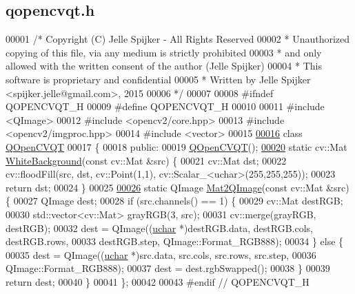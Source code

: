 \hypertarget{qopencvqt_8h_source}{}\subsection{qopencvqt.\+h}
\label{qopencvqt_8h_source}

\begin{DoxyCode}
00001 \textcolor{comment}{/* Copyright (C) Jelle Spijker - All Rights Reserved}
00002 \textcolor{comment}{ * Unauthorized copying of this file, via any medium is strictly prohibited}
00003 \textcolor{comment}{ * and only allowed with the written consent of the author (Jelle Spijker)}
00004 \textcolor{comment}{ * This software is proprietary and confidential}
00005 \textcolor{comment}{ * Written by Jelle Spijker <spijker.jelle@gmail.com>, 2015}
00006 \textcolor{comment}{ */}
00007 
00008 \textcolor{preprocessor}{#ifndef QOPENCVQT\_H}
00009 \textcolor{preprocessor}{#define QOPENCVQT\_H}
00010 
00011 \textcolor{preprocessor}{#include <QImage>}
00012 \textcolor{preprocessor}{#include <opencv2/core.hpp>}
00013 \textcolor{preprocessor}{#include <opencv2/imgproc.hpp>}
00014 \textcolor{preprocessor}{#include <vector>}
00015 
\hypertarget{qopencvqt_8h_source_l00016}{}\hyperlink{class_q_open_c_v_q_t}{00016} \textcolor{keyword}{class }\hyperlink{class_q_open_c_v_q_t}{QOpenCVQT}
00017 \{
00018 \textcolor{keyword}{public}:
00019   \hyperlink{class_q_open_c_v_q_t_a6c108b923cac9d18ae3fd75215aca6a5}{QOpenCVQT}();
\hypertarget{qopencvqt_8h_source_l00020}{}\hyperlink{class_q_open_c_v_q_t_a3aa480e80e8d70328811d0ac75b2df52}{00020}   \textcolor{keyword}{static} cv::Mat \hyperlink{class_q_open_c_v_q_t_a3aa480e80e8d70328811d0ac75b2df52}{WhiteBackground}(\textcolor{keyword}{const} cv::Mat &src) \{
00021     cv::Mat dst;
00022     cv::floodFill(src, dst, cv::Point(1,1), cv::Scalar\_<uchar>(255,255,255));
00023     \textcolor{keywordflow}{return} dst;
00024   \}
00025 
\hypertarget{qopencvqt_8h_source_l00026}{}\hyperlink{class_q_open_c_v_q_t_ab1d34f10d11fbf4ddc00ce55c0255023}{00026}   \textcolor{keyword}{static} QImage \hyperlink{class_q_open_c_v_q_t_ab1d34f10d11fbf4ddc00ce55c0255023}{Mat2QImage}(\textcolor{keyword}{const} cv::Mat &src) \{
00027     QImage dest;
00028     \textcolor{keywordflow}{if} (src.channels() == 1) \{
00029       cv::Mat destRGB;
00030       std::vector<cv::Mat> grayRGB(3, src);
00031       cv::merge(grayRGB, destRGB);
00032       dest = QImage((\hyperlink{_soil_math_types_8h_a65f85814a8290f9797005d3b28e7e5fc}{uchar} *)destRGB.data, destRGB.cols, destRGB.rows,
00033                     destRGB.step, QImage::Format\_RGB888);
00034     \} \textcolor{keywordflow}{else} \{
00035       dest = QImage((\hyperlink{_soil_math_types_8h_a65f85814a8290f9797005d3b28e7e5fc}{uchar} *)src.data, src.cols, src.rows, src.step,
00036                     QImage::Format\_RGB888);
00037       dest = dest.rgbSwapped();
00038     \}
00039     \textcolor{keywordflow}{return} dest;
00040   \}
00041 \};
00042 
00043 \textcolor{preprocessor}{#endif // QOPENCVQT\_H}
\end{DoxyCode}
